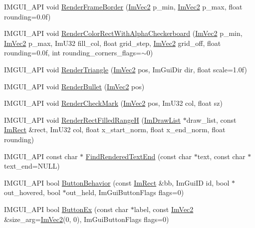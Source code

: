 \begin{DoxyCompactItemize}
\item 
I\+M\+G\+U\+I\+\_\+\+A\+PI void \hyperlink{namespace_im_gui_adc76239c2006e66f8dab7638529a763d}{Render\+Frame\+Border} (\hyperlink{struct_im_vec2}{Im\+Vec2} p\+\_\+min, \hyperlink{struct_im_vec2}{Im\+Vec2} p\+\_\+max, float rounding=0.\+0f)
\item 
I\+M\+G\+U\+I\+\_\+\+A\+PI void \hyperlink{namespace_im_gui_a4715686ee0c613e8518c0f5e92c358ce}{Render\+Color\+Rect\+With\+Alpha\+Checkerboard} (\hyperlink{struct_im_vec2}{Im\+Vec2} p\+\_\+min, \hyperlink{struct_im_vec2}{Im\+Vec2} p\+\_\+max, Im\+U32 fill\+\_\+col, float grid\+\_\+step, \hyperlink{struct_im_vec2}{Im\+Vec2} grid\+\_\+off, float rounding=0.\+0f, int rounding\+\_\+corners\+\_\+flags=$\sim$0)
\item 
I\+M\+G\+U\+I\+\_\+\+A\+PI void \hyperlink{namespace_im_gui_ad11a82904a65722d285230567af826b8}{Render\+Triangle} (\hyperlink{struct_im_vec2}{Im\+Vec2} pos, Im\+Gui\+Dir dir, float scale=1.\+0f)
\item 
I\+M\+G\+U\+I\+\_\+\+A\+PI void \hyperlink{namespace_im_gui_a2d0e4160081b3953fc8f88e2d8e8da15}{Render\+Bullet} (\hyperlink{struct_im_vec2}{Im\+Vec2} pos)
\item 
I\+M\+G\+U\+I\+\_\+\+A\+PI void \hyperlink{namespace_im_gui_a6adfc430445ed42a65556ffb0d58a8b8}{Render\+Check\+Mark} (\hyperlink{struct_im_vec2}{Im\+Vec2} pos, Im\+U32 col, float sz)
\item 
I\+M\+G\+U\+I\+\_\+\+A\+PI void \hyperlink{namespace_im_gui_af311762331bda4508b25e05f6afc7f45}{Render\+Rect\+Filled\+RangeH} (\hyperlink{struct_im_draw_list}{Im\+Draw\+List} $\ast$draw\+\_\+list, const \hyperlink{struct_im_rect}{Im\+Rect} \&rect, Im\+U32 col, float x\+\_\+start\+\_\+norm, float x\+\_\+end\+\_\+norm, float rounding)
\item 
I\+M\+G\+U\+I\+\_\+\+A\+PI const char $\ast$ \hyperlink{namespace_im_gui_a7671e1dbc803a31b06081b52a771d83f}{Find\+Rendered\+Text\+End} (const char $\ast$text, const char $\ast$text\+\_\+end=N\+U\+LL)
\item 
I\+M\+G\+U\+I\+\_\+\+A\+PI bool \hyperlink{namespace_im_gui_a65a4f18b1bc8ce0f351687922089f374}{Button\+Behavior} (const \hyperlink{struct_im_rect}{Im\+Rect} \&bb, Im\+Gui\+ID id, bool $\ast$out\+\_\+hovered, bool $\ast$out\+\_\+held, Im\+Gui\+Button\+Flags flags=0)
\item 
I\+M\+G\+U\+I\+\_\+\+A\+PI bool \hyperlink{namespace_im_gui_ae479220c66b039874c6e4c9e9b22849f}{Button\+Ex} (const char $\ast$label, const \hyperlink{struct_im_vec2}{Im\+Vec2} \&size\+\_\+arg=\hyperlink{struct_im_vec2}{Im\+Vec2}(0, 0), Im\+Gui\+Button\+Flags flags=0)

\end{DoxyCompactItemize}
